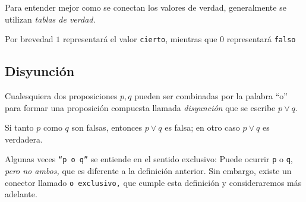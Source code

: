     \begin{observacion}
        Para entender mejor como se conectan los valores de verdad, generalmente se utilizan \emph{tablas de verdad.}  
        
        Por brevedad $1$ representará el valor \texttt{cierto}, mientras que $0$ representará \texttt{falso}
    \end{observacion}
    

\subsection{Disyunción}


    Cualesquiera dos proposiciones $p,q$ pueden ser combinadas por la palabra ``o'' para formar una proposición compuesta llamada \emph{disyunción} que se escribe $p \vee q .$



    \begin{definicion}
        Si tanto $p$ como $q$ son falsas, entonces $p \vee q$ es falsa; en otro caso $p\vee q$ es verdadera.
    \end{definicion}
 \begin{observacion}
  Algunas veces \texttt{``p o q''} se entiende en el sentido exclusivo: Puede ocurrir \texttt{p} o \texttt{q}, \emph{pero no ambos,} que es diferente a la definición anterior. Sin embargo, existe un conector llamado \texttt{o exclusivo,} que cumple esta definición y consideraremos más adelante. 
 \end{observacion}



